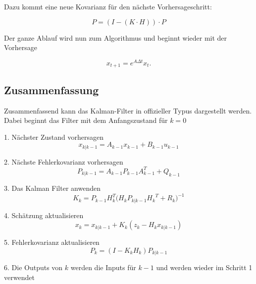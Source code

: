 Dazu kommt  eine neue Kovarianz für den nächste Vorhersageschritt:

\begin{equation}
P=(I-(K \cdot H)) \cdot P  
\end{equation}

Der ganze Ablauf wird nun zum Algorithmus und beginnt wieder mit der Vorhersage 

\begin{equation}
{x_{t+1}}=e^{A\Delta t}{ x_t}.
\end{equation} 


\subsection{Zusammenfassung }
Zusammenfassend kann das Kalman-Filter in offizieller Typus dargestellt werden. Dabei beginnt das Filter mit dem Anfangszustand für $k=0$

1. Nächster Zustand vorhersagen
\begin{equation}
{x_{k|k-1}}={A_{k-1}}{x_{k-1}}+{B_{k-1}}{u_{k-1}}
\end{equation} 

2. Nächste Fehlerkovarianz vorhersagen
\begin{equation}
{P_{k|k-1}}={A_{k-1}}{P_{k-1}}{A_{k-1}^T}+{Q_{k-1}}
\end{equation} 


3. Das Kalman Filter anwenden
\begin{equation}
{K_k}={P_{k-1}}{H_{k}^T({H_k}{P_{k|k-1}}{H_k}^T}+{R_k})^{-1}
\end{equation}

4. Schätzung aktualisieren
\begin{equation}
{x_k}={x_{k|k-1}}+{K_k}({z_k}-{H_k}{x_{k|k-1}})
\end{equation}  

5. Fehlerkovarianz aktualisieren
\begin{equation}
{P_k}=(I-{K_k}{H_k}){P_{k|k-1}}
\end{equation}  

6. Die Outputs von $k$ werden die Inputs für ${k-1}$ und werden wieder im Schritt 1 verwendet


